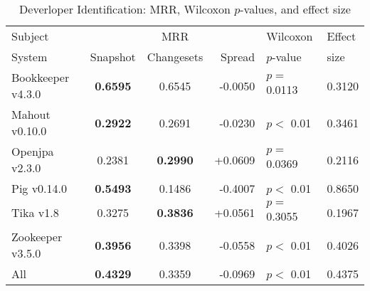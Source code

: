 \begin{table}[t]
\centering
\caption{Deverloper Identification: MRR, Wilcoxon $p$-values, and effect size}
\begin{tabular}{l|ccr|ll}
\toprule
Subject & & MRR & & Wilcoxon & Effect \\
System  &  Snapshot & Changesets & Spread & $p$-value & size \\
\midrule
Bookkeeper v4.3.0 & {\bf 0.6595 } & 0.6545 & -0.0050 & $p = $ 0.0113 & 0.3120 \\
Mahout v0.10.0 & {\bf 0.2922 } & 0.2691 & -0.0230 & $p < $ 0.01 & 0.3461 \\
Openjpa v2.3.0 & 0.2381 & {\bf 0.2990 } & +0.0609 & $p = $ 0.0369 & 0.2116 \\
Pig v0.14.0 & {\bf 0.5493 } & 0.1486 & -0.4007 & $p < $ 0.01 & 0.8650 \\
Tika v1.8 & 0.3275 & {\bf 0.3836 } & +0.0561 & $p = $ 0.3055 & 0.1967 \\
Zookeeper v3.5.0 & {\bf 0.3956 } & 0.3398 & -0.0558 & $p < $ 0.01 & 0.4026 \\
\midrule
All & {\bf 0.4329 } & 0.3359 & -0.0969 & $p < $ 0.01 & 0.4375 \\
\bottomrule
\end{tabular}
\label{table:triage_rq1}
\end{table}
